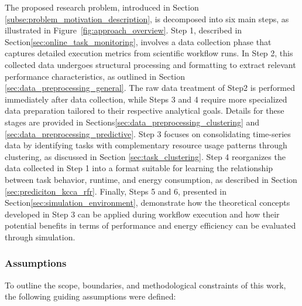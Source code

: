 The proposed research problem, introduced in Section \ref{subse:problem_motivation_description}, is decomposed into six main steps, as illustrated in Figure~\ref{fig:approach_overview}. Step 1, described in Section\ref{sec:online_task_monitoring}, involves a data collection phase that captures detailed execution metrics from scientific workflow runs. In Step 2, this collected data undergoes structural processing and formatting to extract relevant performance characteristics, as outlined in Section \ref{sec:data_preprocessing_general}. The raw data treatment of Step2 is performed immediately after data collection, while Steps 3 and 4 require more specialized data preparation tailored to their respective analytical goals. Details for these stages are provided in Sections\ref{sec:data_preprocessing_clustering} and \ref{sec:data_preprocessing_predictive}.
Step 3 focuses on consolidating time-series data by identifying tasks with complementary resource usage patterns through clustering, as discussed in Section \ref{sec:task_clustering}. Step 4 reorganizes the data collected in Step 1 into a format suitable for learning the relationship between task behavior, runtime, and energy consumption, as described in Section \ref{sec:prediciton_kcca_rfr}. Finally, Steps 5 and 6, presented in Section\ref{sec:simulation_environment}, demonstrate how the theoretical concepts developed in Step 3 can be applied during workflow execution and how their potential benefits in terms of performance and energy efficiency can be evaluated through simulation.

\subsubsection{Assumptions}
\label{sec:assumptions}

To outline the scope, boundaries, and methodological constraints of this work, the following guiding assumptions were defined:

